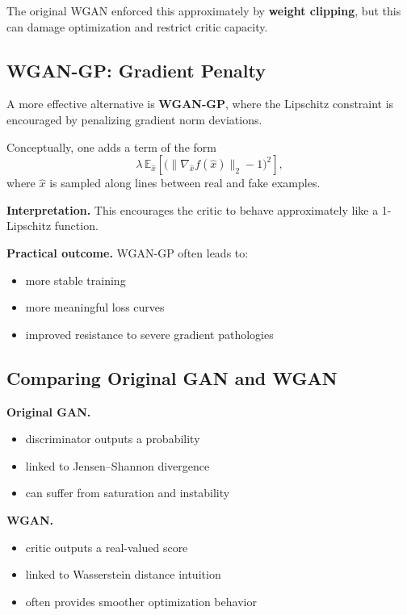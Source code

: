 \medskip

\noindent
The original WGAN enforced this approximately by \textbf{weight clipping}, but this can damage optimization and restrict critic capacity.

\subsection{WGAN-GP: Gradient Penalty}

A more effective alternative is \textbf{WGAN-GP}, where the Lipschitz constraint is encouraged by penalizing gradient norm deviations.

\medskip

\noindent
Conceptually, one adds a term of the form
\[
\lambda \, \mathbb{E}_{\hat{x}}
\left[
\bigl(\|\nabla_{\hat{x}} f(\hat{x})\|_2 - 1\bigr)^2
\right],
\]
where $\hat{x}$ is sampled along lines between real and fake examples.

\medskip

\noindent
\textbf{Interpretation.}
This encourages the critic to behave approximately like a 1-Lipschitz function.

\medskip

\noindent
\textbf{Practical outcome.}
WGAN-GP often leads to:
\begin{itemize}
    \item more stable training
    \item more meaningful loss curves
    \item improved resistance to severe gradient pathologies
\end{itemize}

\subsection{Comparing Original GAN and WGAN}

\textbf{Original GAN.}
\begin{itemize}
    \item discriminator outputs a probability
    \item linked to Jensen--Shannon divergence
    \item can suffer from saturation and instability
\end{itemize}

\medskip

\noindent
\textbf{WGAN.}
\begin{itemize}
    \item critic outputs a real-valued score
    \item linked to Wasserstein distance intuition
    \item often provides smoother optimization behavior
\end{itemize}

